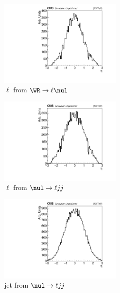 \begin{figure}
	\centering
	\begin{subfigure}[t]{2.4in}
		\centering
		\includegraphics[width=2.4in]{figures/etaMatchedRecoEleFromWr_mwr2200_mnu1100.pdf}
		\caption{$\ell$ from $\WR \rightarrow \ell\nul$}\label{fig:wrLeptJetEtasa}
	\end{subfigure}
	\thickspace
	\begin{subfigure}[t]{2.4in}
		\centering
		\includegraphics[width=2.4in]{figures/etaMatchedRecoEleFromNu_mwr2200_mnu1100.pdf}
		\caption{$\ell$ from $\nul \rightarrow \ell jj$}\label{fig:wrLeptJetEtasb}
	\end{subfigure}
	\newline
	\newline
	\newline
	\newline
	\begin{subfigure}[t]{2.4in}
		\centering
		\includegraphics[width=2.4in]{figures/etaMatchedRecoJetOne_mwr2200_mnu1100.pdf}
		\caption{jet from $\nul \rightarrow \ell jj$}\label{fig:wrLeptJetEtasc}
	\end{subfigure}
	\thickspace
	\begin{subfigure}[t]{2.4in}
		\centering

\end{subfigure}
\end{figure}
